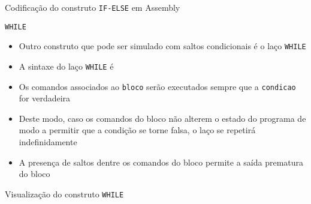 \begin{frame}[fragile]{Codificação do construto {\tt IF-ELSE} em Assembly}
\end{frame}

\begin{frame}[fragile]{\tt WHILE}

    \begin{itemize}
        \item Outro construto que pode ser simulado com saltos condicionais é o laço \texttt{WHILE}

        \item A sintaxe do laço \texttt{WHILE} é


        \item Os comandos associados ao \texttt{bloco} serão executados sempre que a 
            \texttt{condicao} for verdadeira

        \item Deste modo, caso os comandos do bloco não alterem o estado do programa de modo 
            a permitir que a condição se torne falsa, o laço se repetirá indefinidamente

        \item A presença de saltos dentre os comandos do bloco permite a saída prematura do bloco
    \end{itemize}

\end{frame}

\begin{frame}[fragile]{Visualização do construto {\tt WHILE}}
    \begin{figure}[ht]
        \centering
    \end{figure}
\end{frame}

